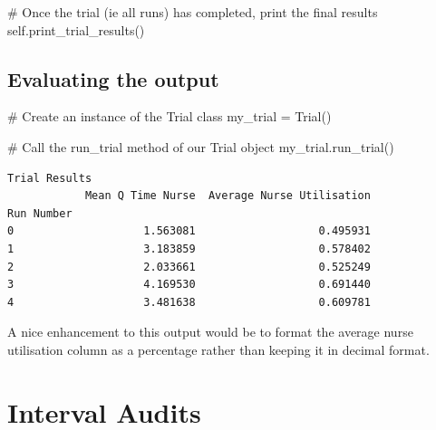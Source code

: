 \documentclass[
  letterpaper,
  DIV=11,
  numbers=noendperiod]{scrreprt}
\newenvironment{Shaded}{}{}
\newcommand{\CommentTok}[1]{\textcolor[rgb]{0.42,0.45,0.49}{#1}}
\newcommand{\NormalTok}[1]{\textcolor[rgb]{0.14,0.16,0.18}{#1}}
\newcommand{\OperatorTok}[1]{\textcolor[rgb]{0.14,0.16,0.18}{#1}}
\newcommand{\VariableTok}[1]{\textcolor[rgb]{0.89,0.38,0.04}{#1}}
\begin{document}
\begin{tcolorbox}
\begin{Shaded}
\begin{Highlighting}[]
        \CommentTok{\# Once the trial (ie all runs) has completed, print the final results}
        \VariableTok{self}\NormalTok{.print\_trial\_results()}
\end{Highlighting}
\end{Shaded}

\end{tcolorbox}

\subsection{Evaluating the output}\label{evaluating-the-output}

\begin{Shaded}
\begin{Highlighting}[]
\CommentTok{\# Create an instance of the Trial class}
\NormalTok{my\_trial }\OperatorTok{=}\NormalTok{ Trial()}

\CommentTok{\# Call the run\_trial method of our Trial object}
\NormalTok{my\_trial.run\_trial()}
\end{Highlighting}
\end{Shaded}

\begin{verbatim}
Trial Results
            Mean Q Time Nurse  Average Nurse Utilisation
Run Number                                              
0                    1.563081                   0.495931
1                    3.183859                   0.578402
2                    2.033661                   0.525249
3                    4.169530                   0.691440
4                    3.481638                   0.609781
\end{verbatim}

\begin{tcolorbox}[enhanced jigsaw, colframe=quarto-callout-tip-color-frame, bottomtitle=1mm, breakable, rightrule=.15mm, coltitle=black, colbacktitle=quarto-callout-tip-color!10!white, opacityback=0, leftrule=.75mm, arc=.35mm, toptitle=1mm, title=\textcolor{quarto-callout-tip-color}{\faLightbulb}\hspace{0.5em}{Tip}, titlerule=0mm, colback=white, toprule=.15mm, bottomrule=.15mm, left=2mm, opacitybacktitle=0.6]

A nice enhancement to this output would be to format the average nurse
utilisation column as a percentage rather than keeping it in decimal
format.

\end{tcolorbox}

\section{Interval Audits}\label{interval-audits}
\end{document}
